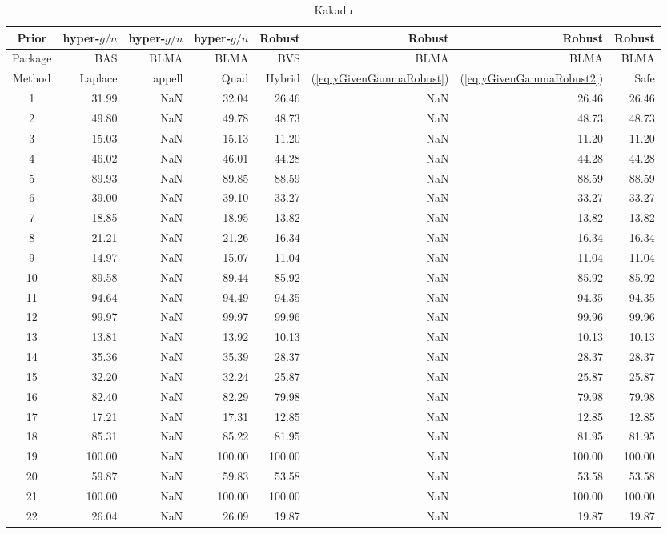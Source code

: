 \documentclass{article}[12pt]
\begin{document}
\begin{table}[ht]
	\centering
	{\small 	
	\begin{tabular}{c|rrr|rrrr}
		Prior   & hyper-$g/n$ & hyper-$g/n$ & hyper-$g/n$ & Robust &  Robust & Robust & Robust \\		
		\hline
		Package & BAS         & BLMA        & BLMA        & BVS & BLMA & BLMA & BLMA  \\
		\hline 
		Method  & Laplace     & appell      & Quad  & Hybrid & (\ref{eq:yGivenGammaRobust}) & (\ref{eq:yGivenGammaRobust2}) & Safe \\ 
		\hline
		1 & 31.99 & NaN & 32.04 & 26.46 & NaN & 26.46 & 26.46 \\ 
		2 & 49.80 & NaN & 49.78 & 48.73 & NaN & 48.73 & 48.73 \\ 
		3 & 15.03 & NaN & 15.13 & 11.20 & NaN & 11.20 & 11.20 \\ 
		4 & 46.02 & NaN & 46.01 & 44.28 & NaN & 44.28 & 44.28 \\ 
		5 & 89.93 & NaN & 89.85 & 88.59 & NaN & 88.59 & 88.59 \\ 
		6 & 39.00 & NaN & 39.10 & 33.27 & NaN & 33.27 & 33.27 \\ 
		7 & 18.85 & NaN & 18.95 & 13.82 & NaN & 13.82 & 13.82 \\ 
		8 & 21.21 & NaN & 21.26 & 16.34 & NaN & 16.34 & 16.34 \\ 
		9 & 14.97 & NaN & 15.07 & 11.04 & NaN & 11.04 & 11.04 \\ 
		10 & 89.58 & NaN & 89.44 & 85.92 & NaN & 85.92 & 85.92 \\ 
		11 & 94.64 & NaN & 94.49 & 94.35 & NaN & 94.35 & 94.35 \\ 
		12 & 99.97 & NaN & 99.97 & 99.96 & NaN & 99.96 & 99.96 \\ 
		13 & 13.81 & NaN & 13.92 & 10.13 & NaN & 10.13 & 10.13 \\ 
		14 & 35.36 & NaN & 35.39 & 28.37 & NaN & 28.37 & 28.37 \\ 
		15 & 32.20 & NaN & 32.24 & 25.87 & NaN  & 25.87 & 25.87 \\ 
		16 & 82.40 & NaN & 82.29 & 79.98 & NaN & 79.98 & 79.98 \\ 
		17 & 17.21 & NaN & 17.31 & 12.85 & NaN & 12.85 & 12.85 \\ 
		18 & 85.31 & NaN & 85.22 & 81.95 & NaN & 81.95 & 81.95 \\ 
		19 & 100.00 & NaN & 100.00 & 100.00 & NaN & 100.00 & 100.00 \\ 
		20 & 59.87 & NaN & 59.83 & 53.58 & NaN & 53.58 & 53.58 \\ 
		21 & 100.00 & NaN & 100.00 & 100.00 & NaN  & 100.00 & 100.00 \\ 
		22 & 26.04 & NaN & 26.09 & 19.87 & NaN  & 19.87 & 19.87 \\ 
		\hline
	\end{tabular}
}
	\caption{Kakadu}
	\label{tab:KakaduResults2}
\end{table}
\end{document}
